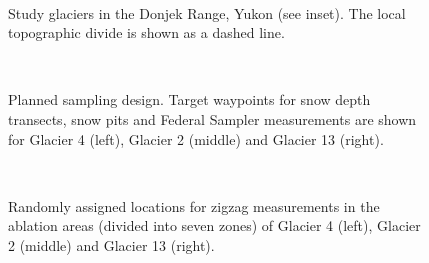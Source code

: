 \documentclass{sfuthesis}
\begin{document}
\begin{figure}
	\centering
	\\
	\caption{Study glaciers in the Donjek Range, Yukon (see inset). The local topographic divide is shown as a dashed line.}
	\label{studysites}
\end{figure}

\begin{figure}
	\centering
	\\
	\caption{Planned sampling design. Target waypoints for snow depth transects, snow pits and Federal Sampler measurements are shown for Glacier 4 (left), Glacier 2 (middle) and Glacier 13 (right).}
	\label{transect_planned}
	\end{figure}

\begin{figure}
	\centering
	\\
	\caption{Randomly assigned locations for zigzag measurements in the ablation areas (divided into seven zones) of Glacier 4 (left), Glacier 2 (middle) and Glacier 13 (right).}
	\label{zigzag_planned}
\end{figure}
\end{document}
